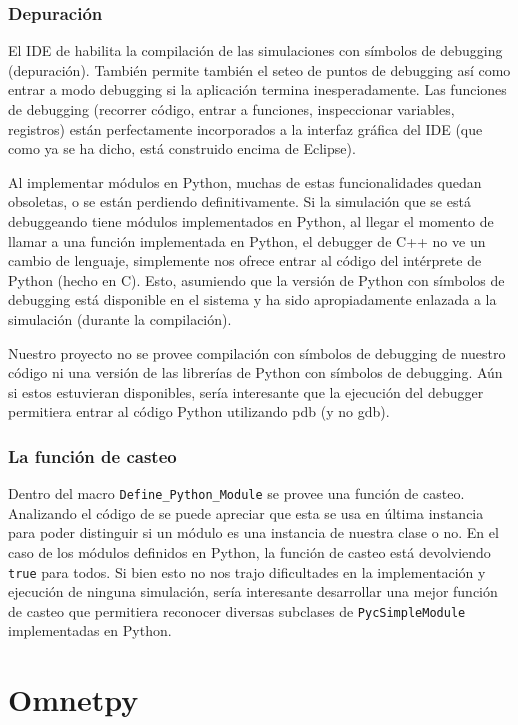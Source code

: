 \documentclass[]{article}
\begin{document}
\subsubsection{Depuración}

El IDE de \omnetpp{} habilita la compilación de las simulaciones con símbolos de
debugging (depuración). También permite también el seteo de puntos de debugging
así como entrar a modo debugging si la aplicación termina inesperadamente. Las
funciones de debugging (recorrer código, entrar a funciones, inspeccionar
variables, registros) están perfectamente incorporados a la interfaz gráfica
del IDE (que como ya se ha dicho, está construido encima de Eclipse).

Al implementar módulos en Python, muchas de estas funcionalidades quedan
obsoletas, o se están perdiendo definitivamente. Si la simulación que se está
debuggeando tiene módulos implementados en Python, al llegar el momento de
llamar a una función implementada en Python, el debugger de C++ no ve un cambio
de lenguaje, simplemente nos ofrece entrar al código del intérprete de Python
(hecho en C). Esto, asumiendo que la versión de Python con símbolos de
debugging está disponible en el sistema y ha sido apropiadamente enlazada a la
simulación (durante la compilación).

Nuestro proyecto no se provee compilación con símbolos de debugging de nuestro
código ni una versión de las librerías de Python con símbolos de debugging. Aún
si estos estuvieran disponibles, sería interesante que la ejecución del
debugger permitiera entrar al código Python utilizando pdb (y no gdb).

\subsubsection{La función de casteo}

Dentro del macro \verb!Define_Python_Module! se provee una función de casteo.
Analizando el código de \omnetpp{} se puede apreciar que esta se usa en última
instancia para poder distinguir si un módulo es una instancia de nuestra clase
o no. En el caso de los módulos definidos en Python, la función de casteo está
devolviendo \verb!true! para todos. Si bien esto no nos trajo dificultades en la
implementación y ejecución de ninguna simulación, sería interesante desarrollar
una mejor función de casteo que permitiera reconocer diversas subclases de
\verb!PycSimpleModule! implementadas en Python.

\section{Omnetpy}\label{sec:omnetpy}
\end{document}
